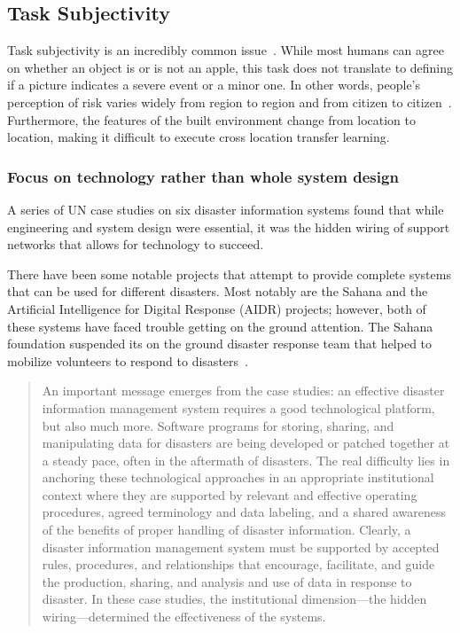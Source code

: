 \subsection{Task Subjectivity}
Task subjectivity is an incredibly common
issue~\cite{nguyenDamageAssessmentSocial2017,
quarantelliUrbanVulnerabilityDisasters2003}. While most humans can agree on
whether an object is or is not an apple, this task does not translate to
defining if a picture indicates a severe event or a minor one. 
In other words, people's perception of risk varies widely from region to region
and from citizen to citizen~\cite{quarantelliUrbanVulnerabilityDisasters2003}.
Furthermore, the features of the built environment change from location to
location, making it difficult to execute cross location transfer learning.

\subsubsection{Focus on technology rather than whole system design}
A series of UN case studies on six disaster information systems found that while
engineering and system design were essential, it was the hidden wiring of support
networks that allows for technology to succeed.

There have been some notable projects that attempt to provide complete systems
that can be used for different disasters. Most notably are the Sahana and the
Artificial Intelligence for Digital Response (AIDR) projects; however, 
both of these systems have faced trouble getting on the ground attention.
The Sahana foundation suspended its on the ground disaster response team
that helped to mobilize volunteers to respond to disasters~\cite{SahanaAGM2018}.

\begin{quote}
An important message emerges from the case studies: an effective disaster
information management system requires a good technological platform,
but also much more. Software programs for storing, sharing, and manipulating
data for disasters are being developed or patched together at a steady pace,
often in the aftermath of disasters. The real difficulty lies in anchoring
these technological approaches in an appropriate institutional context where
they are supported by relevant and effective operating procedures, agreed
terminology and data labeling, and a shared awareness of the benefits of proper
handling of disaster information. Clearly, a disaster information management
system must be supported by accepted rules, procedures, and relationships
that encourage, facilitate, and guide the production, sharing, and analysis and
use of data in response to disaster. In these case studies, the institutional
dimension---the hidden wiring---determined the effectiveness of the
systems.~\cite{aminDataNaturalDisasters2008}
\end{quote}
